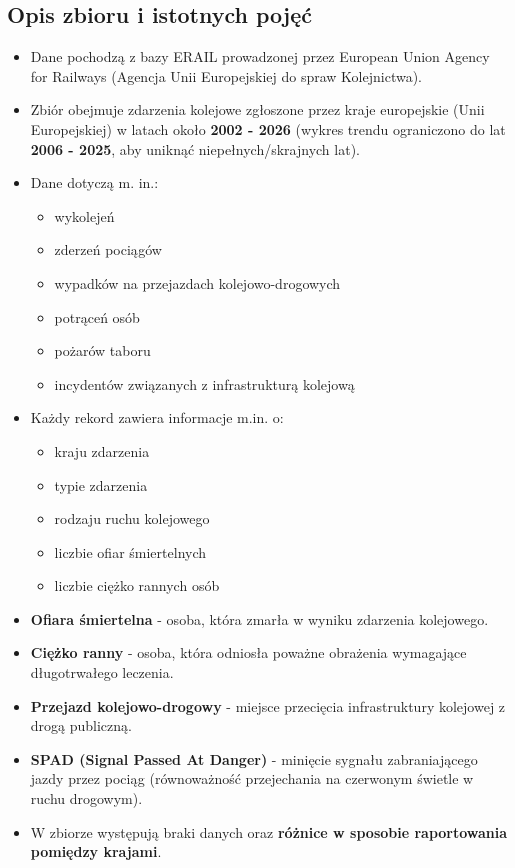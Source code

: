 \documentclass[12pt]{article}
\begin{document}
\subsection{Opis zbioru i istotnych pojęć}
\begin{itemize}
    \item Dane pochodzą z bazy ERAIL prowadzonej przez European Union Agency for Railways (Agencja Unii Europejskiej do spraw Kolejnictwa).
    
    \item Zbiór obejmuje zdarzenia kolejowe zgłoszone przez kraje europejskie (Unii Europejskiej) w latach około \textbf{2002 - 2026} (wykres trendu ograniczono do lat \textbf{2006 - 2025}, aby uniknąć niepełnych/skrajnych lat).
    
    \item Dane dotyczą m. in.:
    \begin{itemize}
        \item wykolejeń
        \item zderzeń pociągów
        \item wypadków na przejazdach kolejowo-drogowych
        \item potrąceń osób
        \item pożarów taboru
        \item incydentów związanych z infrastrukturą kolejową
    \end{itemize}
    
    \item Każdy rekord zawiera informacje m.in. o:
    \begin{itemize}
        \item kraju zdarzenia
        \item typie zdarzenia
        \item rodzaju ruchu kolejowego
        \item liczbie ofiar śmiertelnych
        \item liczbie ciężko rannych osób
    \end{itemize}
    
    \item \textbf{Ofiara śmiertelna} - osoba, która zmarła w wyniku zdarzenia kolejowego.
    
    \item \textbf{Ciężko ranny} - osoba, która odniosła poważne obrażenia wymagające długotrwałego leczenia.
    
    \item \textbf{Przejazd kolejowo-drogowy} - miejsce przecięcia infrastruktury kolejowej z drogą publiczną.
    
    \item \textbf{SPAD (Signal Passed At Danger)} - minięcie sygnału zabraniającego jazdy przez pociąg (równoważność przejechania na czerwonym świetle w ruchu drogowym).
    
    \item W zbiorze występują braki danych oraz \textbf{różnice w sposobie raportowania pomiędzy krajami}.
\end{itemize}
\end{document}
